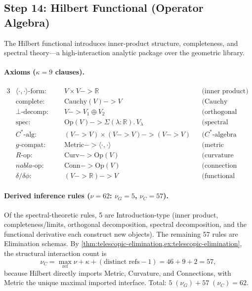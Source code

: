 \documentclass[11pt,a4paper]{article}
\def\to{->}%
\def\nabla{nabla}%
\theoremstyle{plain}
\theoremstyle{definition}
\theoremstyle{remark}
\newcommand{\R}{\mathbb{R}}
\begin{document}
\subsection{Step 14: Hilbert Functional (Operator Algebra)}
\label{app:hilbert-spec}

The Hilbert functional introduces inner-product structure, completeness, and spectral theory---a high-interaction analytic package over the geometric library.

\paragraph{Axioms ($\kappa = 9$ clauses).}
\begin{alignat*}{3}
    &\langle\cdot,\cdot\rangle\text{-form:} &\quad& V \times V \to \R
        && \text{(inner product)} \\
    &\mathrm{complete}\text{:}               && \mathrm{Cauchy}(V) \to V
        && \text{(Cauchy completeness)} \\
    &\perp\text{-decomp:}                    && V \to V_1 \oplus V_2
        && \text{(orthogonal decomposition)} \\
    &\mathrm{spec}\text{:}                   && \mathrm{Op}(V) \to \Sigma(\lambda : \R).\, V_\lambda
        && \text{(spectral decomposition)} \\
    &C^*\text{-alg:}                         && (V \to V) \times (V \to V) \to (V \to V)
        && \text{($C^*$-algebra structure)} \\
    &g\text{-compat:}                        && \mathrm{Metric} \to \langle\cdot,\cdot\rangle
        && \text{(metric compatibility)} \\
    &R\text{-op:}                            && \mathrm{Curv} \to \mathrm{Op}(V)
        && \text{(curvature operator)} \\
    &\nabla\text{-op:}                       && \mathrm{Conn} \to \mathrm{Op}(V)
        && \text{(connection operator)} \\
    &\delta/\delta\phi\text{:}               && (V \to \R) \to V
        && \text{(functional derivative)}
\end{alignat*}

\paragraph{Derived inference rules ($\nu = 62$: $\nu_G = 5$, $\nu_C = 57$).}
Of the spectral-theoretic rules, 5 are Introduction-type (inner product, completeness/limits, orthogonal decomposition, spectral decomposition, and the functional derivative each construct new objects).
The remaining 57 rules are Elimination schemas.
By \cref{thm:telescopic-elimination,ex:telescopic-elimination}, the structural interaction count is
\[
  \nu_C
  =
  \max_{\mathrm{ref}} \nu + \kappa + (\text{distinct refs} - 1)
  =
  46 + 9 + 2
  =
  57,
\]
because Hilbert directly imports Metric, Curvature, and Connections, with Metric the unique maximal imported interface.
Total: $5\;(\nu_G) + 57\;(\nu_C) = 62$.
\end{document}
